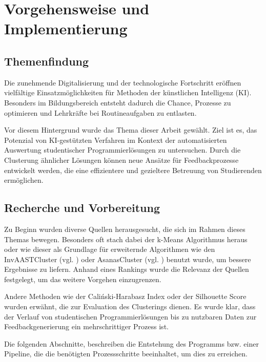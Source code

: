 \chapter{Vorgehensweise und Implementierung}

\section{Themenfindung}
Die zunehmende Digitalisierung und der technologische Fortschritt eröffnen vielfältige Einsatzmöglichkeiten für Methoden der künstlichen Intelligenz (KI). Besonders im Bildungsbereich entsteht dadurch die Chance, Prozesse zu optimieren und Lehrkräfte bei Routineaufgaben zu entlasten.

Vor diesem Hintergrund wurde das Thema dieser Arbeit gewählt. Ziel ist es, das Potenzial von KI-gestützten Verfahren im Kontext der automatisierten Auswertung studentischer Programmierlösungen zu untersuchen. Durch die Clusterung ähnlicher Lösungen können neue Ansätze für Feedbackprozesse entwickelt werden, die eine effizientere und gezieltere Betreuung von Studierenden ermöglichen.


\section{Recherche und Vorbereitung}
Zu Beginn wurden diverse Quellen herausgesucht, die sich im Rahmen dieses Themas bewegen. Besonders oft stach dabei der k-Means Algorithmus heraus oder wie dieser als Grundlage für erweiternde Algorithmen wie den InvAASTCluster (vgl. \cite{Orvalho.28.06.2022}) oder AsanasCluster (vgl. \cite{Paiva.2024}) benutzt wurde, um bessere Ergebnisse zu liefern. Anhand eines Rankings wurde die Relevanz der Quellen festgelegt, um das weitere Vorgehen einzugrenzen.

Andere Methoden wie der Caliński-Harabasz Index oder der Silhouette Score wurden erwähnt, die zur Evaluation des Clusterings dienen. Es wurde klar, dass der Verlauf von studentischen Programmierlösungen bis zu nutzbaren Daten zur Feedbackgenerierung ein mehrschrittiger Prozess ist.

Die folgenden Abschnitte, beschreiben die Entstehung des Programms bzw. einer Pipeline, die die benötigten Prozessschritte beeinhaltet, um dies zu erreichen.

